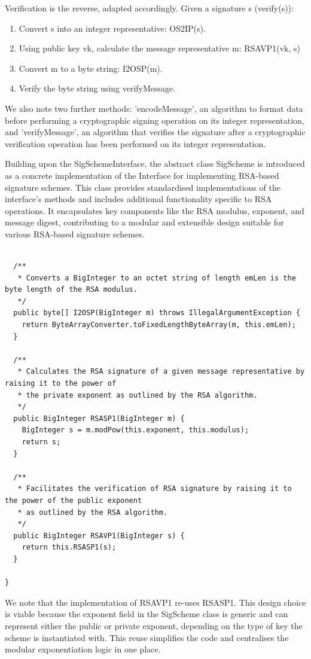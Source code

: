 \documentclass[]{final_report}
\theoremstyle{definition}
\begin{document}
Verification is the reverse, adapted accordingly. Given a signature s (verify(s)):

\begin{enumerate}
\item Convert s into an integer representative: OS2IP(s).

\item Using public key vk, calculate the message representative m: RSAVP1(vk, s)

\item Convert m to a byte string: I2OSP(m).

\item Verify the byte string using verifyMessage.
\end{enumerate}

We also note two further methods: 'encodeMessage', an algorithm to format data before performing a cryptographic signing operation on its integer representation, and 'verifyMessage', an algorithm that verifies the signature after a cryptographic verification operation has been performed on its integer representation. 
 
Building upon the SigSchemeInterface, the abstract class SigScheme is introduced as a concrete implementation of the Interface for implementing RSA-based signature schemes. This class provides standardised implementations of the interface's methods and 
includes additional functionality specific to RSA operations. It encapsulates key components like the RSA modulus, exponent, and message digest, contributing to a modular and extensible design suitable for various RSA-based signature schemes.

\begin{lstlisting}[caption=Implementation of RSA primitives]

  /**
   * Converts a BigInteger to an octet string of length emLen is the byte length of the RSA modulus.
   */
  public byte[] I2OSP(BigInteger m) throws IllegalArgumentException {
    return ByteArrayConverter.toFixedLengthByteArray(m, this.emLen);
  }

  /**
   * Calculates the RSA signature of a given message representative by raising it to the power of
   * the private exponent as outlined by the RSA algorithm.
   */
  public BigInteger RSASP1(BigInteger m) {
    BigInteger s = m.modPow(this.exponent, this.modulus);
    return s;
  }

  /**
   * Facilitates the verification of RSA signature by raising it to the power of the public exponent
   * as outlined by the RSA algorithm.
   */
  public BigInteger RSAVP1(BigInteger s) {
    return this.RSASP1(s);
  }

}
 \end{lstlisting}
We note that the implementation of RSAVP1 re-uses RSASP1. This design choice is viable because the exponent field in the SigScheme class is generic and can represent either the public or private exponent, depending on the type of key the scheme is instantiated with. This reuse simplifies the code and centralises the modular exponentiation logic in one place.
 
\end{document}
